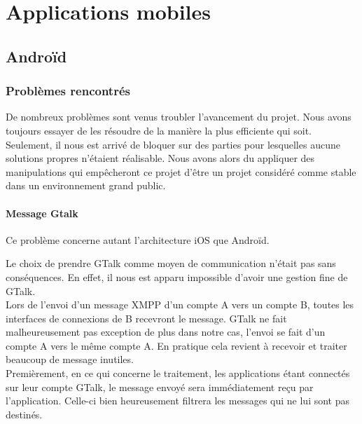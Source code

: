 \section{Applications mobiles}


\subsection{Androïd}

\subsubsection{Problèmes rencontrés}

De nombreux problèmes sont venus troubler l'avancement du projet. Nous avons toujours essayer de les
résoudre de la manière la plus efficiente qui soit. Seulement, il nous est arrivé de bloquer sur des
parties pour lesquelles aucune solutions propres n'étaient réalisable. Nous avons alors du appliquer 
des manipulations qui empêcheront ce projet d'être un projet considéré comme stable dans un environnement
grand public.

\paragraph{Message Gtalk}

Ce problème concerne autant l'architecture iOS que Androïd. 

Le choix de prendre GTalk comme moyen de communication n'était pas sans conséquences. En effet, il nous
est apparu impossible d'avoir une gestion fine de GTalk.
\\

Lors de l'envoi d'un message XMPP d'un compte A vers un compte B, toutes les interfaces de connexions
de B recevront le message. GTalk ne fait malheureusement pas exception de plus dans notre cas, l'envoi
se fait d'un compte A vers le même compte A. En pratique cela revient à recevoir et traiter beaucoup de
message inutiles.
\\

Premièrement, en ce qui concerne le traitement, les applications étant connectés sur leur compte GTalk, 
le message envoyé sera immédiatement reçu par l'application. Celle-ci bien heureusement filtrera les 
messages qui ne lui sont pas destinés. 

